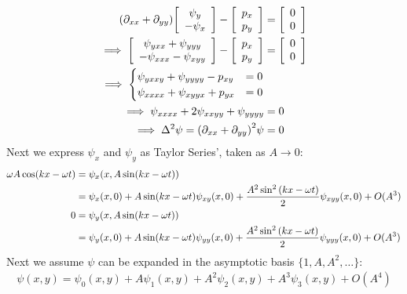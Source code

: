 \documentclass{article} %
\theoremstyle{plain}
\newcommand{\lap}{\Delta}
\numberwithin{equation}{section} %
\numberwithin{figure}{section} %
\numberwithin{table}{section} %
\begin{document}
\begin{align*}
    \qty(\partial_{xx} + \partial_{yy})\qty[\begin{array}{c} \psi_y \\ -\psi_x \end{array}] - \qty[\begin{array}{c} p_x \\ p_y \end{array}] &= \qty[\begin{array}{c} 0 \\ 0 \end{array}] \\
    \implies \qty[\begin{array}{cc}\psi_{yxx} + \psi_{yyy} \\ -\psi_{xxx} - \psi_{xyy}\end{array}] - \qty[\begin{array}{c} p_x \\ p_y \end{array}] &= \qty[\begin{array}{c} 0 \\ 0 \end{array}] \\
    \implies \begin{cases}
        \psi_{yxxy} + \psi_{yyyy} - p_{xy} &= 0 \\
        \psi_{xxxx} + \psi_{xyyx} + p_{yx} &= 0
    \end{cases} \\
    \implies \psi_{xxxx} + 2\psi_{xxyy} + \psi_{yyyy} &= 0 \\
    \implies \lap^2\psi = \qty(\partial_{xx} + \partial_{yy})^2\psi &= 0
\end{align*}
Next we express $\psi_x$ and $\psi_y$ as Taylor Series', taken as $A \rightarrow 0$:
\begin{align*}
    \omega A \cos(kx - \omega t) &= \psi_x\qty(x, A\sin(kx - \omega t)) \\
    &= \psi_x(x,0) + A\sin(kx - \omega t)\psi_{xy}(x,0) + \frac{A^2\sin^2\qty(kx - \omega t)}{2}\psi_{xyy}(x,0) + O(A^3) \\
    0 &= \psi_y\qty(x, A\sin(kx - \omega t)) \\
    &= \psi_y(x,0) + A\sin(kx - \omega t)\psi_{yy}(x,0) + \frac{A^2\sin^2\qty(kx - \omega t)}{2}\psi_{yyy}(x,0) + O(A^3)
\end{align*}
Next we assume $\psi$ can be expanded in the asymptotic basis $\{1,A,A^2,\dots\}$:
\begin{align*}
    \psi(x,y) = \psi_0(x,y) + A\psi_1(x,y) + A^2\psi_2(x,y) + A^3\psi_3(x,y) + O(A^4)
\end{align*}
\end{document}

